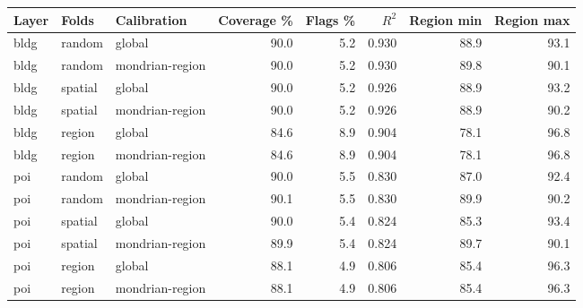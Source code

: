 \begin{tabular}{lllrrrrr}
\toprule
Layer & Folds & Calibration & Coverage \% & Flags \% & $R^2$ & Region min & Region max \\
\midrule
bldg & random & global & 90.0 & 5.2 & 0.930 & 88.9 & 93.1 \\
bldg & random & mondrian-region & 90.0 & 5.2 & 0.930 & 89.8 & 90.1 \\
bldg & spatial & global & 90.0 & 5.2 & 0.926 & 88.9 & 93.2 \\
bldg & spatial & mondrian-region & 90.0 & 5.2 & 0.926 & 88.9 & 90.2 \\
bldg & region & global & 84.6 & 8.9 & 0.904 & 78.1 & 96.8 \\
bldg & region & mondrian-region & 84.6 & 8.9 & 0.904 & 78.1 & 96.8 \\
poi & random & global & 90.0 & 5.5 & 0.830 & 87.0 & 92.4 \\
poi & random & mondrian-region & 90.1 & 5.5 & 0.830 & 89.9 & 90.2 \\
poi & spatial & global & 90.0 & 5.4 & 0.824 & 85.3 & 93.4 \\
poi & spatial & mondrian-region & 89.9 & 5.4 & 0.824 & 89.7 & 90.1 \\
poi & region & global & 88.1 & 4.9 & 0.806 & 85.4 & 96.3 \\
poi & region & mondrian-region & 88.1 & 4.9 & 0.806 & 85.4 & 96.3 \\
\bottomrule
\end{tabular}